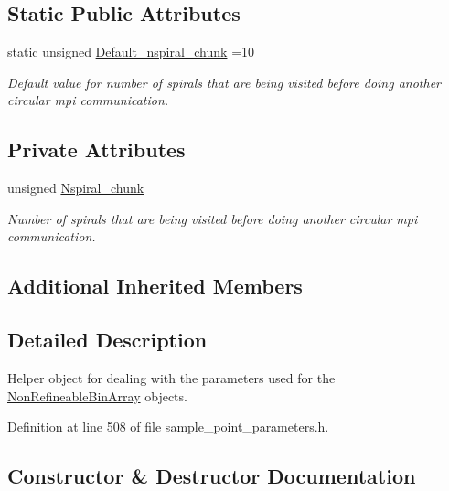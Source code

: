 \subsection*{Static Public Attributes}
\begin{DoxyCompactItemize}
\item 
static unsigned \hyperlink{classoomph_1_1NonRefineableBinArrayParameters_a117183d5d98185162e5fd150c89cfde6}{Default\+\_\+nspiral\+\_\+chunk} =10
\begin{DoxyCompactList}\small\item\em Default value for number of spirals that are being visited before doing another circular mpi communication. \end{DoxyCompactList}\end{DoxyCompactItemize}
\subsection*{Private Attributes}
\begin{DoxyCompactItemize}
\item 
unsigned \hyperlink{classoomph_1_1NonRefineableBinArrayParameters_a5d642bbd9718111a8aba118e2e911e4f}{Nspiral\+\_\+chunk}
\begin{DoxyCompactList}\small\item\em Number of spirals that are being visited before doing another circular mpi communication. \end{DoxyCompactList}\end{DoxyCompactItemize}
\subsection*{Additional Inherited Members}


\subsection{Detailed Description}
Helper object for dealing with the parameters used for the \hyperlink{classNonRefineableBinArray}{Non\+Refineable\+Bin\+Array} objects. 

Definition at line 508 of file sample\+\_\+point\+\_\+parameters.\+h.



\subsection{Constructor \& Destructor Documentation}
\mbox{\label{classoomph_1_1NonRefineableBinArrayParameters_a9dd0d9a3ee86b493d7944efe943ed419}} 
